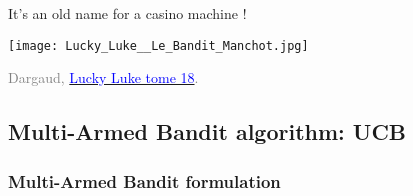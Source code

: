 \begin{frameO}
    \begin{center}
        It's an old name for a casino machine \slotmachine{} !
    \end{center}

    \begin{center}
        \texttt{[image: Lucky\_Luke\_\_Le\_Bandit\_Manchot.jpg]}

        \begin{tiny}
            \textcolor{gray}{
                \textcopyright{} Dargaud,
                \href{https://www.dargaud.com/bd/LUCKY-LUKE/Lucky-Luke/Lucky-Luke-tome-18-Bandit-manchot-Le}{\textcolor{blue}{Lucky Luke tome 18}}.
            }
        \end{tiny}
    \end{center}
\end{frameO}



\subsection{Multi-Armed Bandit algorithm: UCB}

\subsubsection{Multi-Armed Bandit formulation}

